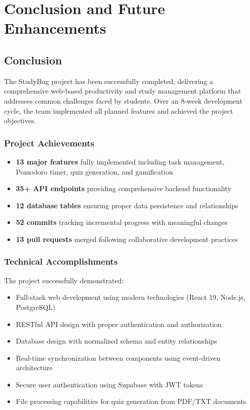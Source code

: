 \chapter{Conclusion and Future Enhancements}

\section{Conclusion}
The StudyBug project has been successfully completed, delivering a comprehensive web-based productivity and study management platform that addresses common challenges faced by students. Over an 8-week development cycle, the team implemented all planned features and achieved the project objectives.

\subsection{Project Achievements}
\begin{itemize}
    \item \textbf{13 major features} fully implemented including task management, Pomodoro timer, quiz generation, and gamification
    \item \textbf{35+ API endpoints} providing comprehensive backend functionality
    \item \textbf{12 database tables} ensuring proper data persistence and relationships
    \item \textbf{52 commits} tracking incremental progress with meaningful changes
    \item \textbf{13 pull requests} merged following collaborative development practices
\end{itemize}

\subsection{Technical Accomplishments}
The project successfully demonstrated:
\begin{itemize}
    \item Full-stack web development using modern technologies (React 19, Node.js, PostgreSQL)
    \item RESTful API design with proper authentication and authorization
    \item Database design with normalized schema and entity relationships
    \item Real-time synchronization between components using event-driven architecture
    \item Secure user authentication using Supabase with JWT tokens
    \item File processing capabilities for quiz generation from PDF/TXT documents
\end{itemize}

